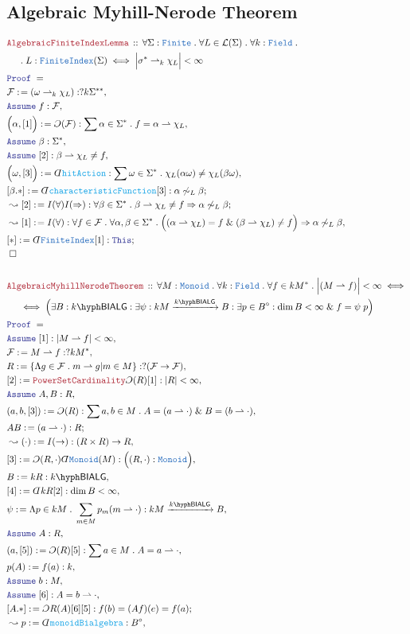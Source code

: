 \documentclass[12pt]{scrartcl}%
\newcommand{\TYPE}[1]{\textcolor{NavyBlue}{\mathtt{#1}}}%
\newcommand{\FUNC}[1]{\textcolor{Cerulean}{\mathtt{#1}}}%
\newcommand{\LOGIC}[1]{\textcolor{Blue}{\mathtt{#1}}}%
\newcommand{\THM}[1]{\textcolor{Maroon}{\mathtt{#1}}}%
\renewcommand{\.}{\; . \;} %
\newcommand{\de}{: \kern 0.1pc =} %
\newcommand{\Theorem}[2]{& \THM{#1} \, :: \, #2 \\ & \Proof = \\ } %
\newcommand{\NewLine}{\\ & \kern 1pc}%
\newcommand{\Page}[1]{ \begin{align*} #1 \end{align*}  }%
\newcommand{ \bd }{ \ByDef }%
\renewcommand{\And}{\; \& \;}%
\newcommand{\Imply}{\Rightarrow}%
\newcommand{\Say}[3]{& #1 \de #2 : #3, \\} %
\newcommand{\Conclude}[3]{& #1 \de #2 : #3; \\}%
\newcommand{\Derive}[3]{& \leadsto #1 \de #2 : #3, \\} %
\newcommand{\DeriveConclude}[3]{& \leadsto #1 \de #2 : #3 ; \\} %
\newcommand{\Assume}[2]{& \LOGIC{Assume} \; #1 : #2, \\} %
\newcommand{\QED}{\; \square} %
\newcommand{\EndProof}{& \QED \\} %
\newcommand{\ByDef}{\rotatebox[origin=c]{-180}{$D$}}%
\newcommand{\ByConstr}{\rotatebox[origin=c]{-180}{$C$}}%
\newcommand{\Proof}{\LOGIC{Proof} \; } %
\newcommand{\Arrow}[1]{\xrightarrow{#1}}%
\renewcommand{\L}{\mathcal{L}}
\newcommand{\Field}{\TYPE{Field}}
\newcommand{\F}{\mathcal{F}}
\newcommand{\hit}{\rightharpoonup}
\newcommand{\BIALG}[1]{#1\hyph\mathsf{BIALG}}%
\begin{document}
\subsection{Algebraic Myhill-Nerode Theorem}
\Page{
	\Theorem{AlgebraicFiniteIndexLemma}
	{
		\forall \Sigma : \TYPE{Finite} \.
		\forall  L \in \L(\Sigma) \.
		\forall  k : \Field \. \NewLine \. 
		L : \TYPE{FiniteIndex}(\Sigma) \iff
		\Big|  \sigma^* \hit_k \chi_L \Big| < \infty
	}
	\Say{\F}{  ( \omega \hit_k \chi_L)  }{?k\Sigma^{**}}
	\Assume{f}{\F}
	\Say{\Big( \alpha,[1] \Big)}{\ByConstr (\F)}{\sum \alpha \in \Sigma^* \. f = \alpha \hit \chi_L }
	\Assume{\beta}{\Sigma^*}
	\Assume{[2]}{ \beta \hit \chi_L \neq f }
	\Say{\Big(\omega,[3]\Big)}{\bd \FUNC{hitAction}}{\sum \omega \in \Sigma^* \. \chi_L(\alpha\omega) \neq \chi_L(\beta\omega)}
	\Conclude{[\beta.*]}{\bd \FUNC{characteristicFunction}[3]}{\alpha \not \sim_L \beta}
	\DeriveConclude{[2]}{I(\forall)I(\Imply)}{\forall \beta \in \Sigma^* \. \beta \hit \chi_L \neq f \Imply \alpha \not \sim_L \beta} 
	\Derive{[1]}{I(\forall)}
	{
	    \forall f \in \F \. 
	    \forall \alpha,\beta \in \Sigma^* \. 
	    \Big( (\alpha \hit \chi_L) = f \And
	    (\beta  \hit \chi_L) \neq f \Big) \Imply
	    \alpha \not \sim_L \beta
	}
	\Conclude{[*]}{\bd \TYPE{FiniteIndex}[1]}{\LOGIC{This}}
	\EndProof
	\\
	\Theorem{AlgebraicMyhillNerodeTheorem}
	{
		\forall M : \TYPE{Monoid} \.
		\forall k : \TYPE{Field} \. 
		\forall f \in kM^* \. 
		\Big| ( M \hit f) \Big| < \infty \iff \NewLine \iff 
		\Big(\exists B : \BIALG{k} :
		\exists \psi : kM \Arrow{\BIALG{k}} B :
		\exists p \in B^\circ :
		\dim B < \infty \And  f = \psi \; p \Big)
	}
	\Assume{[1]}{| M \hit f| < \infty}
	\Say{\F}{M \hit f}{ ?kM^*  }
	\Say{R}{\{ \Lambda g \in \F \. m \hit g | m \in M  \}}{?(\F \to \F)}
	\Say{[2]}{ \THM{PowerSetCardinality}\ByConstr(R)[1] }{ |R| < \infty   }
	\Assume{A,B}{R}
	\Say{(a,b,[3])}{\ByConstr(R) }{\sum a,b \in M \. A = (a \hit \cdot) \And B = (b \hit \cdot) }
	\Conclude{AB}{(a \hit \cdot)}{R}
	\Derive{(\cdot)}{I(\to)}{(R \times R) \to R}
	\Say{[3]}{\ByConstr (R,\cdot)\bd \TYPE{Monoid}(M)}{\Big((R,\cdot):\TYPE{Monoid}\Big)}
	\Say{B}{kR}{\BIALG{k}}
	\Say{[4]}{\bd kR [2]}{\dim B < \infty} 
	\Say{\psi}{ \Lambda p \in kM \. \sum_{m \in M } p_m( m  \hit \cdot ) }{ kM \Arrow{\BIALG{k}} B}
	\Assume{A}{R}
	\Say{(a,[5])}{\ByConstr(R)[5]}{ \sum a \in M \. A = a \hit \cdot  }
	\Say{p(A)}{f(a)}{k}
	\Assume{b}{M}
	\Assume{[6]}{ A = b \hit \cdot}
	\Conclude{[A.*]}{\ByConstr R(A)[6][5]}{  f(b) = (Af)(e) = f(a)   }
	\Derive{p}{\bd \FUNC{monoidBialgebra}}{ B^\circ}
}
\end{document}
